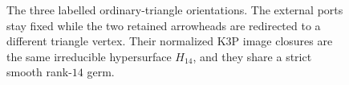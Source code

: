 \begin{figure}[t]
\caption{The three labelled ordinary-triangle orientations.  The external
ports stay fixed while the two retained arrowheads are redirected to a
different triangle vertex.  Their normalized K3P image closures are the
same irreducible hypersurface $H_{14}$, and they share a strict smooth
rank-$14$ germ.}
\label{fig:triangle-orientations}
\end{figure}
